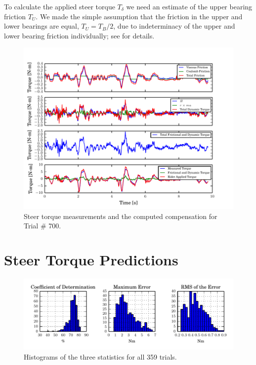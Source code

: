 \documentclass[a4paper]{article}
\begin{document}
To calculate the applied steer torque $T_\delta$ we need an estimate of the
upper bearing friction $T_U$. We made the simple assumption that the friction
in the upper and lower bearings are equal, $T_U = T_B / 2$, due to
indeterminacy of the upper and lower bearing friction individually; see
\cite{Moore2012} for details.

\begin{figure}
  \includegraphics{figures/steer-torque-components.pdf}
  \caption{Steer torque measurements and the computed compensation for Trial \#
    700.}
  \label{fig:steer-torque-components}
\end{figure}

\section*{Steer Torque Predictions}

\begin{figure}
  \label{fig:error-stats}
  \centering
  \includegraphics{figures/error-stats.pdf}
  \caption{Histograms of the three statistics for all 359 trials.}
\end{figure}
\end{document}
